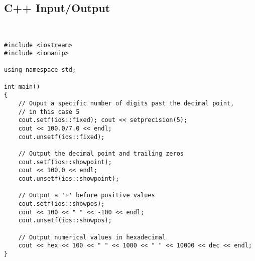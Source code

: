 \subsection{C++ Input/Output}
\begin{lstlisting}


#include <iostream>
#include <iomanip>

using namespace std;

int main()
{
    // Ouput a specific number of digits past the decimal point,
    // in this case 5    
    cout.setf(ios::fixed); cout << setprecision(5);
    cout << 100.0/7.0 << endl;
    cout.unsetf(ios::fixed);
    
    // Output the decimal point and trailing zeros
    cout.setf(ios::showpoint);
    cout << 100.0 << endl;
    cout.unsetf(ios::showpoint);
    
    // Output a '+' before positive values
    cout.setf(ios::showpos);
    cout << 100 << " " << -100 << endl;
    cout.unsetf(ios::showpos);
    
    // Output numerical values in hexadecimal
    cout << hex << 100 << " " << 1000 << " " << 10000 << dec << endl;
}
\end{lstlisting}